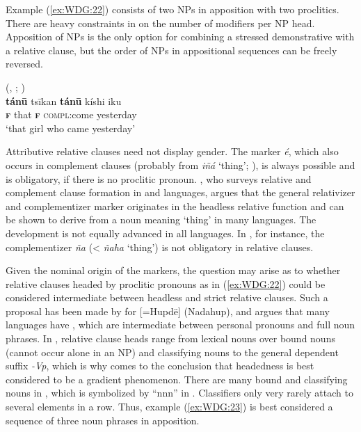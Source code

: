\documentclass[output=collectionpaper]{langsci/langscibook}
\begin{document}
Example (\ref{ex:WDG:22}) consists of two NPs in apposition with two proclitics. There are heavy constraints in  on the number of modifiers per NP head. Apposition of NPs is the only option for combining a stressed demonstrative with a relative clause, but the order of NPs in appositional sequences can be freely reversed.

\ea\label{ex:WDG:22}
 (, ; \citealt[366]{Small1990})\\
\gll \textbf{tánū}	tsīkan	\textbf{tánū}	kíshi	iku\\
\textbf{\textsc{f}}	that	\textbf{\textsc{f}}	\textsc{compl}:come	yesterday\\
\glt `that girl who came yesterday'\\
\z

Attributive relative clauses need not display gender. The marker \textit{é}, which also occurs in complement clauses (probably from \textit{iñá} `thing'; \citealt{Hollenbach1995}), is always possible and is obligatory, if there is no proclitic pronoun. \cite{Hollenbach1995}, who surveys relative and complement clause formation in  and  languages, argues that the general relativizer and complementizer marker originates in the headless relative function and can be shown to derive from a noun meaning `thing' in many  languages. The development is not equally advanced in all  languages. In , for instance, the complementizer \textit{ña} (< \textit{ñaha} `thing') is not obligatory in relative clauses.

Given the nominal origin of the markers, the question may arise as to whether relative clauses headed by proclitic pronouns as in (\ref{ex:WDG:22}) could be considered intermediate between headless and strict relative clauses. Such a proposal has been made by \cite{Epps2012} for  [=Hupdë] (Nadahup), and  argues that many languages have , which are intermediate between personal pronouns and full noun phrases. In , relative clause heads range from lexical nouns over bound nouns (cannot occur alone in an NP) and classifying nouns to the general dependent suffix \textit{-Vp}, which is why \cite{Epps2012} comes to the conclusion that headedness is best considered to be a gradient phenomenon. There are many bound and classifying nouns in , which is symbolized by ``nnn'' in . Classifiers only very rarely attach to several elements in a row. Thus, example (\ref{ex:WDG:23}) is best considered a sequence of three noun phrases in apposition.
\end{document}
